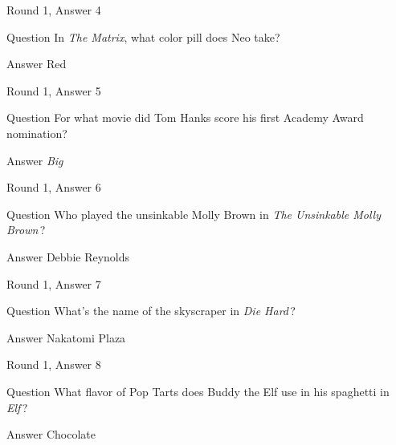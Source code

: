 \documentclass[11pt]{beamer}
\begin{document}
\begin{frame}[t]{Round 1, Answer 4}
\vspace{2em}
\begin{block}{Question}
In \emph{The Matrix}, what color pill does Neo take?
\end{block}
\pause{}
\begin{block}{Answer}
Red
\end{block}
\end{frame}
    

\begin{frame}[t]{Round 1, Answer 5}
\vspace{2em}
\begin{block}{Question}
For what movie did Tom Hanks score his first Academy Award nomination?
\end{block}
\pause{}
\begin{block}{Answer}
\emph{Big}
\end{block}
\end{frame}
    

\begin{frame}[t]{Round 1, Answer 6}
\vspace{2em}
\begin{block}{Question}
Who played the unsinkable Molly Brown in \emph{The Unsinkable Molly Brown}\,?
\end{block}
\pause{}
\begin{block}{Answer}
Debbie Reynolds
\end{block}
\end{frame}
    

\begin{frame}[t]{Round 1, Answer 7}
\vspace{2em}
\begin{block}{Question}
What's the name of the skyscraper in \emph{Die Hard}\,?
\end{block}
\pause{}
\begin{block}{Answer}
Nakatomi Plaza
\end{block}
\end{frame}
    

\begin{frame}[t]{Round 1, Answer 8}
\vspace{2em}
\begin{block}{Question}
What flavor of Pop Tarts does Buddy the Elf use in his spaghetti in \emph{Elf}\,?
\end{block}
\pause{}
\begin{block}{Answer}
Chocolate
\end{block}
\end{frame}
    
\end{document}
